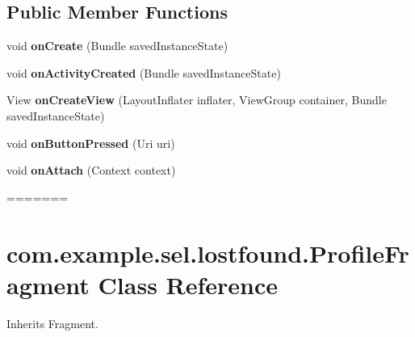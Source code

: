 \subsection*{Public Member Functions}
\begin{DoxyCompactItemize}
\item 
\hypertarget{classcom_1_1example_1_1sel_1_1lostfound_1_1ProfileFragment_a52a51c0a57347d86da5de367f715076f}{void {\bfseries on\-Create} (Bundle saved\-Instance\-State)}\label{classcom_1_1example_1_1sel_1_1lostfound_1_1ProfileFragment_a52a51c0a57347d86da5de367f715076f}

\item 
\hypertarget{classcom_1_1example_1_1sel_1_1lostfound_1_1ProfileFragment_a1930f4c070b5d7a4204422f4e0ddc35f}{void {\bfseries on\-Activity\-Created} (Bundle saved\-Instance\-State)}\label{classcom_1_1example_1_1sel_1_1lostfound_1_1ProfileFragment_a1930f4c070b5d7a4204422f4e0ddc35f}

\item 
\hypertarget{classcom_1_1example_1_1sel_1_1lostfound_1_1ProfileFragment_a7bb29240ea89cc1f9c5539dd9117765e}{View {\bfseries on\-Create\-View} (Layout\-Inflater inflater, View\-Group container, Bundle saved\-Instance\-State)}\label{classcom_1_1example_1_1sel_1_1lostfound_1_1ProfileFragment_a7bb29240ea89cc1f9c5539dd9117765e}

\item 
\hypertarget{classcom_1_1example_1_1sel_1_1lostfound_1_1ProfileFragment_a5d06af34470ca3d940361d9315cd98fb}{void {\bfseries on\-Button\-Pressed} (Uri uri)}\label{classcom_1_1example_1_1sel_1_1lostfound_1_1ProfileFragment_a5d06af34470ca3d940361d9315cd98fb}

\item 
\hypertarget{classcom_1_1example_1_1sel_1_1lostfound_1_1ProfileFragment_a22ef41a710d02636086eb5b6b01a2e1e}{void {\bfseries on\-Attach} (Context context)}\label{classcom_1_1example_1_1sel_1_1lostfound_1_1ProfileFragment_a22ef41a710d02636086eb5b6b01a2e1e}
=======
\hypertarget{classcom_1_1example_1_1sel_1_1lostfound_1_1ProfileFragment}{\section{com.\-example.\-sel.\-lostfound.\-Profile\-Fragment \-Class \-Reference}
\label{classcom_1_1example_1_1sel_1_1lostfound_1_1ProfileFragment}
}


\-Inherits \-Fragment.


\end{DoxyCompactItemize}
